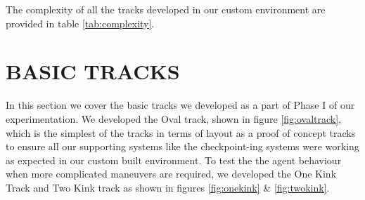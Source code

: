 
The complexity of all the tracks developed in our custom environment are provided in table \ref{tab:complexity}.
\section{BASIC TRACKS} \label{ch5-basictrack}
In this section we cover the basic tracks we developed as a part of Phase I of our experimentation. We developed the Oval track, shown in figure \ref{fig:ovaltrack}, which is the simplest of the tracks in terms of layout as a proof of concept tracks to ensure all our supporting systems like the checkpoint-ing systems were working as expected in our custom built environment. To test the the agent behaviour when more complicated maneuvers are required, we developed the One Kink Track and Two Kink track as shown in figures \ref{fig:onekink} \& \ref{fig:twokink}.

